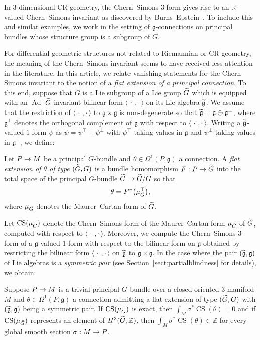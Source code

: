\documentclass[AHL,Unicode,longabstracts]{cedram}
\newcommand{\B}[2]{\langle#1,#2\rangle}
\DeclareMathOperator{\CS}{CS}
\DeclareMathOperator{\Ad}{Ad}
\newcommand*{\R}{\mathbb{R}}
\newcommand{\Z}{\mathbb{Z}}
\newcommand{\fkg}{\mathfrak{g}}
\renewcommand*{\to}{\mathchoice{\longrightarrow}{\rightarrow}{\rightarrow}{\rightarrow}}
\let\oldtilde\tilde
\renewcommand*{\tilde}[1]{\mathchoice{\widetilde{#1}}{\widetilde{#1}}{\oldtilde{#1}}{\oldtilde{#1}}}
\newcommand*{\R}{\mathbb{R}}
\begin{document}
In $3$-dimensional CR-geometry, the Chern--Simons $3$-form gives rise to an $\R$-valued Chern--Simons invariant as discovered by Burns--Epstein~\cite{MR0936085}. To include this and similar examples, we work in the setting of $\fkg$-connections on principal bundles whose structure group is a subgroup of $G$.

For differential geometric structures not related to Riemannian or CR-geometry, the meaning of the Chern--Simons invariant seems to have received less attention in the literature. In this article, we relate vanishing statements for the Chern--Simons invariant to the notion of a \emph{flat extension of a principal connection}. To this end, suppose that $G$ is a Lie subgroup of a Lie group $\tilde{G}$ which is equipped with an $\Ad$-$\tilde{G}$ invariant bilinear form $\B{\,\cdot\,}{\cdot\,}$ on its Lie algebra $\tilde{\fkg}$. We assume that the restriction of $\B{\,\cdot\,}{\cdot\,}$ to $\fkg\times \fkg$ is non-degenerate so that $\tilde{\fkg}=\fkg\oplus \fkg^{\perp}$, where $\fkg^{\perp}$ denotes the orthogonal complement of $\fkg$ with respect to $\B{\,\cdot\,}{\cdot\,}$. Writing a $\tilde{\fkg}$-valued $1$-form $\psi$ as $\psi=\psi^{\top}+\psi^{\perp}$ with $\psi^{\top}$ taking values in $\fkg$ and $\psi^{\perp}$ taking values in $\fkg^{\perp}$, we define:

\begin{defi}\label{defn:flatext}
Let $P \to M$ be a principal $G$-bundle and $\theta \in \Omega^1(P,\fkg)$ a connection. A \emph{flat extension of $\theta$ of type $(\tilde{G},G)$} is a bundle homomorphism $F : P \to \tilde{G}$ into the total space of the principal $G$-bundle $\tilde{G} \to \tilde{G}/G$ so that
\[
\theta=F^*\bigl(\mu_{\tilde{G}}^{\top}\bigr),
\]
where $\mu_{\tilde{G}}$ denotes the Maurer--Cartan form of $\tilde{G}$.
\end{defi}

Let $\CS(\mu_{\tilde G})$ denote the Chern--Simons form of the Maurer--Cartan form $\mu_{\tilde G}$ of $\tilde{G}$, computed with respect to $\B{\,\cdot\,}{\cdot\,}$. Moreover, we compute the Chern--Simons $3$-form of a $\fkg$-valued $1$-form with respect to the bilinear form on $\fkg$ obtained by restricting the bilinear form $\B{\,\cdot\,}{\cdot\,}$ on $\tilde{\fkg}$ to $\fkg\times
\fkg$. In the case where the pair $(\tilde{\fkg},\fkg)$ of Lie algebras is a \emph{symmetric pair} (see Section~\ref{sect:partialblindness} for details), we obtain:

\begin{coro}\label{cor:keystatement}
Suppose $P \to M$ is a trivial principal $G$-bundle over a closed oriented $3$-manifold $M$ and $\theta \in \Omega^1(P,\fkg)$ a connection admitting a flat extension of type $(\tilde{G},G)$ with $(\tilde{\fkg},\fkg)$ being a symmetric pair. If $\CS(\mu_{\tilde{G}})$ is exact, then ${\int_M\!\sigma^*\CS(\theta)\!=\!0}$ and if $\CS(\mu_{\tilde{G}})$ represents an element of $H^3(\tilde{G},\Z)$, then ${\int_M\!\sigma^*\CS(\theta)\!\in\!\Z}$ for every global smooth section $\sigma : M \to P$.
\end{coro}
\end{document}
